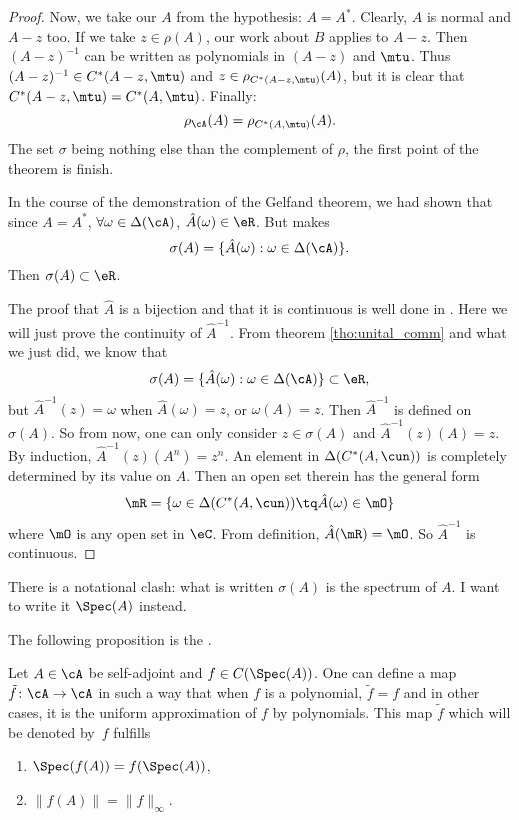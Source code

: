 \begin{proof}
Now, we take our $A$ from the hypothesis: $A=A^*$. Clearly, $A$ is normal and $A-z$ too. If we take $z\in\rho(A)$, our work about $B$ applies to $A-z$. Then $(A-z)^{-1}$ can be written as polynomials in $(A-z)$ and $\mtu$. Thus $(A-z)^{-1}\in C^*(A-z,\mtu)$ and
$z\in\rho_{C^*(A-z,\mtu)}(A)$, but it is clear that $C^*(A-z,\mtu)=C^*(A,\mtu)$. Finally:
\[
   \rho_{\cA}(A)=\rho_{C^*(A,\mtu)}(A).
\]
The set $\sigma$ being nothing else than the complement of $\rho$, the first point of the theorem is finish.

In the course of the demonstration of the Gelfand theorem, we had shown that since $A=A^*$, $\forall\omega\in\Delta(\cA)$, $\hat A(\omega)\in\eR$. But  makes
\[
   \sigma(A)=\{\hat A(\omega):\omega\in\Delta(\cA)\}.
\]
Then $\sigma(A)\subset\eR$.

The proof that $\hat A$ is a bijection and that it is continuous is well done in . Here we will just prove the continuity of $\hat A^{-1}$. From theorem \ref{tho:unital_comm} and what we just did, we know that
\[
   \sigma(A)=\{\hat A(\omega):\omega\in\Delta(\cA)\}\subset\eR,
\]
but $\hat A^{-1}(z)=\omega$ when $\hat A(\omega)=z$, or $\omega(A)=z$. Then $\hat A^{-1}$ is defined on $\sigma(A)$. So from now, one can only consider $z\in\sigma(A)$ and $\hat A^{-1}(z)(A)=z$. By induction, $\hat A^{-1}(z)(A^n)=z^n$. An element in $\Delta(C^*(A,\cun))$ is completely determined by its value on $A$. Then an open set therein has the general form
\[ 
  \mR=\{ \omega\in\Delta(C^*(A,\cun))\tq\hat A(\omega)\in\mO \}
\]
where $\mO$ is any open set in $\eC$. From definition, $\hat A(\mR)=\mO$. So $\hat A^{-1}$ is continuous.

\end{proof}


\begin{probleme}
    There is a notational clash: what is written $\sigma(A)$ is the spectrum of $A$. I want to write it $\Spec(A)$ instead.
\end{probleme}

The following proposition is the . 
\begin{theorem}     \label{ThoContFuncCalculus}
Let $A\in\cA$ be self-adjoint and $f\in C(\Spec(A))$. One can define a map $\tilde f\colon \cA\to \cA$ in such a way that when $f$ is a polynomial, $\tilde f=f$ and in other cases, it is the uniform approximation of $f$ by polynomials. This map $\tilde f$ which will be denoted by~$f$ fulfills
\begin{enumerate}
\item $\Spec(f(A))=f(\Spec(A))$,  \label{enuji}
\item $\|f(A)\|=\|f\|_{\infty}$.
\end{enumerate}\label{prop:cont_calc}
\end{theorem}

